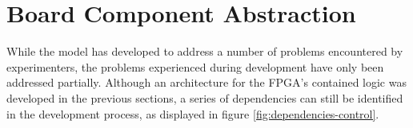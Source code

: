 \documentclass[openright]{template/uva-bachelor-thesis}
\begin{document}










\section{Board Component Abstraction}
\label{sectioncontrollerabstraction}





While the model has developed to address a number of problems encountered by experimenters, the problems experienced during development have only been addressed partially. Although an architecture for the FPGA's contained logic was developed in the previous sections, a series of dependencies can still be identified in the development process, as displayed in figure \ref{fig:dependencies-control}.  
\end{document}
